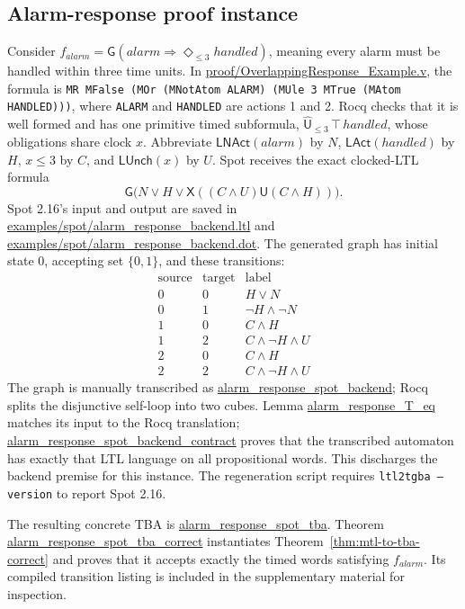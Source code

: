 \documentclass[10pt,journal,compsoc]{IEEEtran}
\newcommand{\Until}{\mathbin{\mathsf{U}}}
\newcommand{\Next}{\mathsf{X}}
\newcommand{\Rocqid}[1]{{\small\url{#1}}}
\begin{document}
\subsection{Alarm-response proof instance}
\label{sec:alarm-example}
Consider $f_{\mathit{alarm}}=\mathsf{G}(\mathit{alarm}\Rightarrow
\Diamond_{\le 3}\mathit{handled})$, meaning every alarm must be handled within
three time units. In
\Rocqid{proof/OverlappingResponse_Example.v}, the formula is
\texttt{MR MFalse (MOr (MNotAtom ALARM) (MUle 3 MTrue (MAtom HANDLED)))},
where \texttt{ALARM} and \texttt{HANDLED} are actions 1 and 2. Rocq checks
that it is well formed and has one primitive timed subformula,
$\widehat{\mathsf{U}}_{\le 3}\,\top\,\mathit{handled}$, whose obligations
share clock $x$. Abbreviate $\mathsf{LNAct}(\mathit{alarm})$ by $N$,
$\mathsf{LAct}(\mathit{handled})$ by $H$, $x\le3$ by $C$, and
$\mathsf{LUnch}(x)$ by $U$. Spot receives the exact clocked-LTL formula
\[
\mathsf{G}\bigl(N\lor H\lor \Next((C\land U)\Until(C\land H))\bigr).
\]
Spot 2.16's input and output are saved in
\Rocqid{examples/spot/alarm_response_backend.ltl} and
\Rocqid{examples/spot/alarm_response_backend.dot}. The generated graph has
initial state 0, accepting set $\{0,1\}$, and these transitions:
\[
\begin{array}{c|c|l}
\text{source}&\text{target}&\text{label}\\ \hline
0&0&H\lor N\\
0&1&\neg H\land\neg N\\
1&0&C\land H\\
1&2&C\land\neg H\land U\\
2&0&C\land H\\
2&2&C\land\neg H\land U
\end{array}
\]
The graph is manually transcribed as
\Rocqid{alarm_response_spot_backend}; Rocq splits the disjunctive
self-loop into two cubes. Lemma
\Rocqid{alarm_response_T_eq} matches its input to the Rocq translation;
\Rocqid{alarm_response_spot_backend_contract} proves that the transcribed
automaton has exactly that LTL language on all propositional words. This
discharges the backend premise for this instance. The regeneration script
requires \texttt{ltl2tgba --version} to report Spot 2.16.

The resulting concrete TBA is
\Rocqid{alarm_response_spot_tba}. Theorem
\Rocqid{alarm_response_spot_tba_correct} instantiates
Theorem~\ref{thm:mtl-to-tba-correct} and proves that it accepts exactly the
timed words satisfying $f_{\mathit{alarm}}$. Its compiled transition listing
is included in the supplementary material for inspection.
\end{document}
